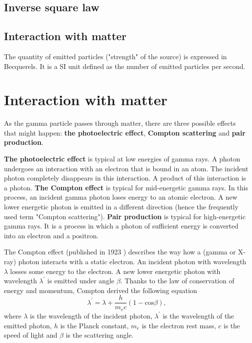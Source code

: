 {  \subsection{Inverse square law}
  \subsection{Interaction with matter}

  The quantity of emitted particles ("strength" of the source) is expressed in Becquerels.
  It is a SI unit defined as the number of emitted particles per second.

  \section{Interaction with matter}
  As the gamma particle passes through matter, there are three possible effects that might happen:
  \textbf{the photoelectric effect}, \textbf{Compton scattering} and \textbf{pair production}.

  \textbf{The photoelectric effect} is typical at low energies of gamma rays. A photon undergoes an interaction with an electron that is bound in an atom. The incident photon completely disappears in this interaction. A product of this interaction is a photon.
  \textbf{The Compton effect} is typical for mid-energetic gamma rays. In this process, an incident gamma photon loses energy to an atomic electron. A new lower energetic photon is emitted in a different direction (hence the frequently used term "Compton scattering").
  \textbf{Pair production} is typical for high-energetic gamma rays. It is a process in which a photon of sufficient energy is converted into an electron and a positron.

  The Compton effect (published in 1923 \cite{}) describes the way how a (gamma or X-ray) photon interacts with a static electron. An incident photon with wavelength $\lambda$ losses some energy to the electron. A new lower energetic photon with wavelength $\lambda^{\prime}$ is emitted under angle $\beta$. Thanks to the law of conservation of energy and momentum, Compton derived the following equation
  \begin{equation}
      \lambda^{\prime} = \lambda + \frac{h}{m_{e}c}(1-\mathrm{cos} \beta),
  \end{equation}
  where $\lambda$ is the wavelength of the incident photon, $\lambda^{\prime}$ is the wavelength of the emitted photon, $h$ is the Planck constant, $m_{e}$ is the electron rest mass, $c$ is the speed of light and $\beta$ is the scattering angle.

}
